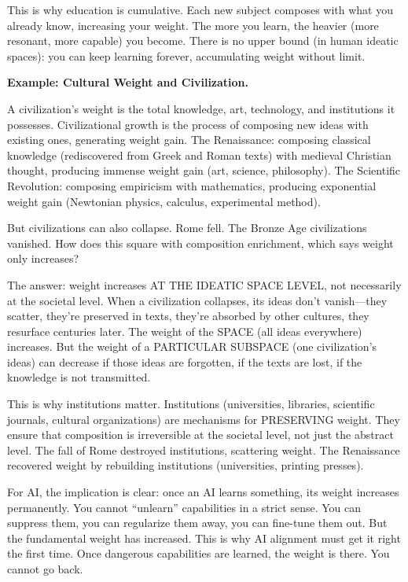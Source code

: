 \begin{interpretation}
This is why education is cumulative. Each new subject composes with what you
already know, increasing your weight. The more you learn, the heavier (more
resonant, more capable) you become. There is no upper bound (in human ideatic
spaces): you can keep learning forever, accumulating weight without limit.

\textbf{Example: Cultural Weight and Civilization.}

A civilization's weight is the total knowledge, art, technology, and institutions
it possesses. Civilizational growth is the process of composing new ideas with
existing ones, generating weight gain. The Renaissance: composing classical
knowledge (rediscovered from Greek and Roman texts) with medieval Christian thought,
producing immense weight gain (art, science, philosophy). The Scientific Revolution:
composing empiricism with mathematics, producing exponential weight gain
(Newtonian physics, calculus, experimental method).

But civilizations can also collapse. Rome fell. The Bronze Age civilizations
vanished. How does this square with composition enrichment, which says weight
only increases?

The answer: weight increases AT THE IDEATIC SPACE LEVEL, not necessarily at the
societal level. When a civilization collapses, its ideas don't vanish---they
scatter, they're preserved in texts, they're absorbed by other cultures, they
resurface centuries later. The weight of the SPACE (all ideas everywhere) increases.
But the weight of a PARTICULAR SUBSPACE (one civilization's ideas) can decrease
if those ideas are forgotten, if the texts are lost, if the knowledge is not
transmitted.

This is why institutions matter. Institutions (universities, libraries, scientific
journals, cultural organizations) are mechanisms for PRESERVING weight. They
ensure that composition is irreversible at the societal level, not just the
abstract level. The fall of Rome destroyed institutions, scattering weight. The
Renaissance recovered weight by rebuilding institutions (universities, printing
presses).

For AI, the implication is clear: once an AI learns something, its weight increases
permanently. You cannot ``unlearn'' capabilities in a strict sense. You can
suppress them, you can regularize them away, you can fine-tune them out. But
the fundamental weight has increased. This is why AI alignment must get it right
the first time. Once dangerous capabilities are learned, the weight is there.
You cannot go back.


\end{interpretation}
